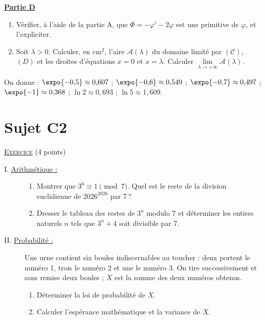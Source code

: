 \underline{\textbf{Partie D}} \newline
\begin{enumerate}
      \item V\'erifier, \`a l'aide de la partie A, que $\Phi = -\varphi' - 2\varphi$ est une primitive de $\varphi$, et l'expliciter.
      \item Soit $\lambda > 0$. Calculer, en cm$^2$, l'aire $\mathscr{A}(\lambda)$ du domaine limit\'e par $(\mathscr{C})$, $(D)$ et les
            droites d'\'equations $x = 0$ et $x = \lambda$. Calculer $\lim\limits_{\lambda \to +\infty} \mathscr{A}(\lambda)$.
\end{enumerate}
\begin{center}
On donne : $\expo{-0{,}5} \approx 0{,}607$ ; $\expo{-0{,}6} \approx 0{,}549$ ; $\expo{-0{,}7} \approx 0{,}497$ ; $\expo{-1} \approx 0{,}368$ ;
$\ln 2 \approx 0{,}693$ ; $\ln 5 \approx 1{,}609$.
\end{center}

\newpage
\section{Sujet C2}
\noindent \underline{\textsc{Exercice}} (4 points)
\begin{description}
\item[I. \underline{Arithm\'etique :}]
      \begin{enumerate}
      \item Montrer que $3^6 \equiv 1 \pmod 7$. Quel est le reste de la division euclidienne de $2026^{2026}$ par 7\,?
      \item Dresser le tableau des restes de $3^n$ modulo 7 et d\'eterminer les entiers naturels $n$ tels que $3^n + 4$ soit divisible par 7.
      \end{enumerate}
\item[II. \underline{Probabilit\'e :}]
      Une urne contient six boules indiscernables au toucher : deux portent le num\'ero 1, trois le num\'ero 2 et une le num\'ero 3.
      On tire successivement et sans remise deux boules ; $X$ est la somme des deux num\'eros obtenus.
      \begin{enumerate}
      \item D\'eterminer la loi de probabilit\'e de $X$.
      \item Calculer l'esp\'erance math\'ematique et la variance de $X$.
      \end{enumerate}
\end{description}

